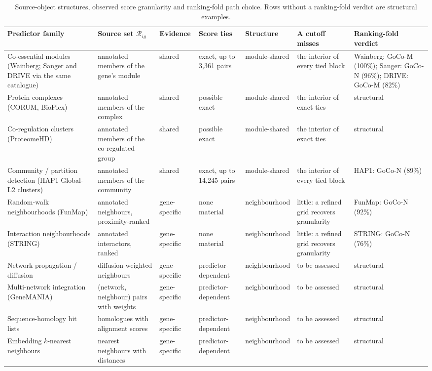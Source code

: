 \begin{table}[htbp]
\centering
\caption{Source-object structures, observed score granularity and ranking-fold path choice. Rows without a ranking-fold verdict are structural examples.}
\label{tab:structures}
\tiny
\setlength{\tabcolsep}{3pt}
\renewcommand{\arraystretch}{1.15}
\begin{tabular}{@{}p{} p{} p{} p{} p{} p{} p{}@{}}
\toprule
Predictor family & Source set $\mathcal R_{ig}$ & Evidence & Score ties & Structure & A cutoff misses & Ranking-fold verdict \\
\midrule
Co-essential modules (Wainberg; Sanger and DRIVE via the same catalogue) & annotated members of the gene's module & shared & exact, up to 3,361 pairs & module-shared & the interior of every tied block & Wainberg: GoCo-M (100\%); Sanger: GoCo-N (96\%); DRIVE: GoCo-M (82\%) \\
Protein complexes (CORUM, BioPlex) & annotated members of the complex & shared & possible exact & module-shared & the interior of exact ties & structural \\
Co-regulation clusters (ProteomeHD) & annotated members of the co-regulated group & shared & possible exact & module-shared & the interior of exact ties & structural \\
Community / partition detection (HAP1 Global-L2 clusters) & annotated members of the community & shared & exact, up to 14,245 pairs & module-shared & the interior of every tied block & HAP1: GoCo-N (89\%) \\
Random-walk neighbourhoods (FunMap) & annotated neighbours, proximity-ranked & gene-specific & none material & neighbourhood & little: a refined grid recovers granularity & FunMap: GoCo-N (92\%) \\
Interaction neighbourhoods (STRING) & annotated interactors, ranked & gene-specific & none material & neighbourhood & little: a refined grid recovers granularity & STRING: GoCo-N (76\%) \\
Network propagation / diffusion & diffusion-weighted neighbours & gene-specific & predictor-dependent & neighbourhood & to be assessed & structural \\
Multi-network integration (GeneMANIA) & (network, neighbour) pairs with weights & gene-specific & predictor-dependent & neighbourhood & to be assessed & structural \\
Sequence-homology hit lists & homologues with alignment scores & gene-specific & predictor-dependent & neighbourhood & to be assessed & structural \\
Embedding $k$-nearest neighbours & nearest neighbours with distances & gene-specific & predictor-dependent & neighbourhood & to be assessed & structural \\
\bottomrule
\end{tabular}
\end{table}
